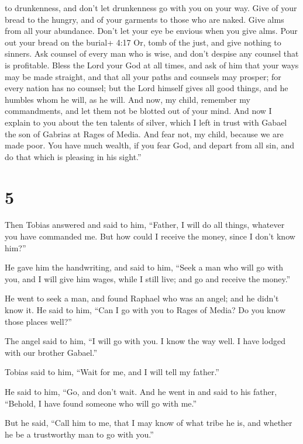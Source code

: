 to drunkenness, and don't let drunkenness go with you on your way.
 Give of your bread to the hungry, and of your garments to
those who are naked. Give alms from all your abundance. Don't let your
eye be envious when you give alms.  Pour out your bread on
the burial+ 4:17 Or, tomb of the just, and give nothing to sinners.
 Ask counsel of every man who is wise, and don't despise
any counsel that is profitable.  Bless the Lord your God at
all times, and ask of him that your ways may be made straight, and that
all your paths and counsels may prosper; for every nation has no
counsel; but the Lord himself gives all good things, and he humbles whom
he will, as he will. And now, my child, remember my commandments, and
let them not be blotted out of your mind.  And now I
explain to you about the ten talents of silver, which I left in trust
with Gabael the son of Gabrias at Rages of Media.  And fear
not, my child, because we are made poor. You have much wealth, if you
fear God, and depart from all sin, and do that which is pleasing in his
sight.''

\hypertarget{section-4}{%
\section{5}\label{section-4}}

 Then Tobias answered and said to him, ``Father, I will do
all things, whatever you have commanded me.  But how could I
receive the money, since I don't know him?''

 He gave him the handwriting, and said to him, ``Seek a man
who will go with you, and I will give him wages, while I still live; and
go and receive the money.''

 He went to seek a man, and found Raphael who was an angel;
 and he didn't know it. He said to him, ``Can I go with you
to Rages of Media? Do you know those places well?''

 The angel said to him, ``I will go with you. I know the way
well. I have lodged with our brother Gabael.''

 Tobias said to him, ``Wait for me, and I will tell my
father.''

 He said to him, ``Go, and don't wait. And he went in and
said to his father, ``Behold, I have found someone who will go with
me.''

But he said, ``Call him to me, that I may know of what tribe he is, and
whether he be a trustworthy man to go with you.''

